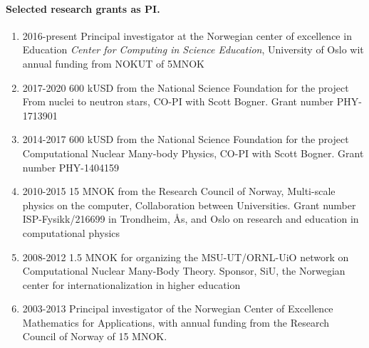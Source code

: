 \documentclass[a4wide,10pt]{article}
\begin{document}
\paragraph{Selected research grants as PI.}
\begin{enumerate}
\item 2016-present Principal investigator at the Norwegian center of excellence in Education \emph{Center for Computing in Science Education}, University of Oslo wit annual funding from NOKUT of 5MNOK

\item 2017-2020 600 kUSD from the National Science Foundation for the project From nuclei to neutron stars, CO-PI with Scott Bogner. Grant number PHY-1713901

\item 2014-2017 600 kUSD from the National Science Foundation for the project Computational Nuclear Many-body Physics, CO-PI with Scott Bogner. Grant number PHY-1404159

\item 2010-2015 15 MNOK from the Research Council of Norway, Multi-scale physics on the computer, Collaboration between Universities. Grant number ISP-Fysikk/216699 in Trondheim, Ås, and Oslo on research and education in computational physics

\item 2008-2012 1.5 MNOK for organizing the MSU-UT/ORNL-UiO network on Computational Nuclear Many-Body Theory. Sponsor, SiU, the Norwegian center for internationalization in higher education

\item 2003-2013 Principal investigator of the Norwegian Center of Excellence Mathematics for Applications, with annual funding from the Research Council of Norway of 15 MNOK.
\end{enumerate}


\end{document}
